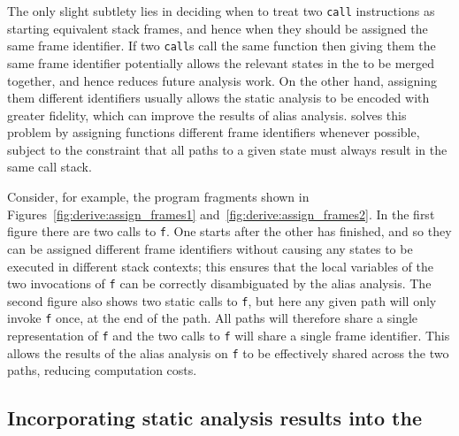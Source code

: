 The only slight subtlety lies in deciding when to treat two
\texttt{call} instructions as starting equivalent stack frames, and
hence when they should be assigned the same frame identifier.  If two
\texttt{call}s call the same function then giving them the same frame
identifier potentially allows the relevant states in the
{\StateMachine} to be merged together, and hence reduces future
analysis work.  On the other hand, assigning them different
identifiers usually allows the static analysis to be encoded with
greater fidelity, which can improve the results of alias analysis.
{\Implementation} solves this problem by assigning functions different
frame identifiers whenever possible, subject to the constraint that
all paths to a given {\StateMachine} state must always result in the
same call stack.

Consider, for example, the program fragments shown in
Figures~\ref{fig:derive:assign_frames1}
and~\ref{fig:derive:assign_frames2}.  In the first figure there are
two calls to \texttt{f}.  One starts after the other has finished, and
so they can be assigned different frame identifiers without causing
any {\StateMachine} states to be executed in different stack contexts;
this ensures that the local variables of the two invocations of
\texttt{f} can be correctly disambiguated by the alias analysis.  The
second figure also shows two static calls to \texttt{f}, but here any
given path will only invoke \texttt{f} once, at the end of the path.
All paths will therefore share a single representation of \texttt{f}
and the two calls to \texttt{f} will share a single frame identifier.
This allows the results of the alias analysis on \texttt{f} to be
effectively shared across the two paths, reducing computation costs.


\subsection{Incorporating static analysis results into the {\StateMachine}}

